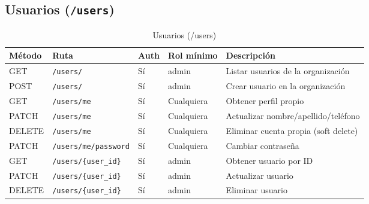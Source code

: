 \subsection{\texorpdfstring{Usuarios (\texttt{/users})}{Usuarios (/users)}}\label{usuarios-users}

\begin{longtable}[]{@{}
  >{\raggedright\arraybackslash}p{}
  >{\raggedright\arraybackslash}p{}
  >{\raggedright\arraybackslash}p{}
  >{\raggedright\arraybackslash}p{}
  >{\raggedright\arraybackslash}p{}@{}}
\caption[Usuarios (/users)]{Usuarios (/users)}\tabularnewline
\toprule\noalign{}
\begin{minipage}[b]{\linewidth}\raggedright
Método
\end{minipage} & \begin{minipage}[b]{\linewidth}\raggedright
Ruta
\end{minipage} & \begin{minipage}[b]{\linewidth}\raggedright
Auth
\end{minipage} & \begin{minipage}[b]{\linewidth}\raggedright
Rol mínimo
\end{minipage} & \begin{minipage}[b]{\linewidth}\raggedright
Descripción
\end{minipage} \\
\midrule\noalign{}
\endhead
\bottomrule\noalign{}
\endlastfoot
GET & \texttt{/users/} & Sí & admin & Listar usuarios de la organización \\
POST & \texttt{/users/} & Sí & admin & Crear usuario en la organización \\
GET & \texttt{/users/me} & Sí & Cualquiera & Obtener perfil propio \\
PATCH & \texttt{/users/me} & Sí & Cualquiera & Actualizar nombre/apellido/teléfono \\
DELETE & \texttt{/users/me} & Sí & Cualquiera & Eliminar cuenta propia (soft delete) \\
PATCH & \texttt{/users/me/password} & Sí & Cualquiera & Cambiar contraseña \\
GET & \texttt{/users/\{user\_id\}} & Sí & admin & Obtener usuario por ID \\
PATCH & \texttt{/users/\{user\_id\}} & Sí & admin & Actualizar usuario \\
DELETE & \texttt{/users/\{user\_id\}} & Sí & admin & Eliminar usuario \\
\end{longtable}

